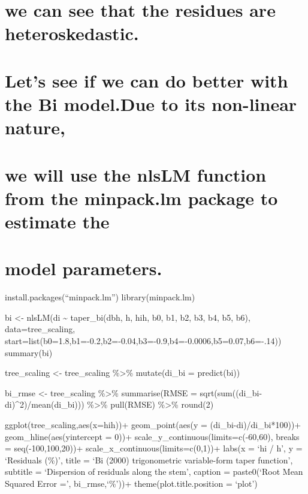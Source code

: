 \documentclass[
]{article}
\begin{document}
\hypertarget{we-can-see-that-the-residues-are-heteroskedastic.}{%
\section{we can see that the residues are
heteroskedastic.}\label{we-can-see-that-the-residues-are-heteroskedastic.}}

\hypertarget{lets-see-if-we-can-do-better-with-the-bi-model.due-to-its-non-linear-nature}{%
\section{Let's see if we can do better with the Bi model.Due to its
non-linear
nature,}\label{lets-see-if-we-can-do-better-with-the-bi-model.due-to-its-non-linear-nature}}

\hypertarget{we-will-use-the-nlslm-function-from-the-minpack.lm-package-to-estimate-the}{%
\section{we will use the nlsLM function from the minpack.lm package to
estimate
the}\label{we-will-use-the-nlslm-function-from-the-minpack.lm-package-to-estimate-the}}

\hypertarget{model-parameters.}{%
\section{model parameters.}\label{model-parameters.}}

install.packages(``minpack.lm'') library(minpack.lm)

bi \textless- nlsLM(di \textasciitilde{} taper\_bi(dbh, h, hih, b0, b1,
b2, b3, b4, b5, b6), data=tree\_scaling,
start=list(b0=1.8,b1=-0.2,b2=-0.04,b3=-0.9,b4=-0.0006,b5=0.07,b6=-.14))
summary(bi)

tree\_scaling \textless- tree\_scaling \%\textgreater\% mutate(di\_bi =
predict(bi))

bi\_rmse \textless- tree\_scaling \%\textgreater\% summarise(RMSE =
sqrt(sum((di\_bi-di)\^{}2)/mean(di\_bi))) \%\textgreater\% pull(RMSE)
\%\textgreater\% round(2)

ggplot(tree\_scaling,aes(x=hih))+ geom\_point(aes(y =
(di\_bi-di)/di\_bi*100))+ geom\_hline(aes(yintercept = 0))+
scale\_y\_continuous(limits=c(-60,60), breaks = seq(-100,100,20))+
scale\_x\_continuous(limits=c(0,1))+ labs(x = `hi / h', y = `Residuals
(\%)', title = `Bi (2000) trigonometric variable-form taper function',
subtitle = `Dispersion of residuals along the stem', caption =
paste0(`Root Mean Squared Error =', bi\_rmse,`\%'))+
theme(plot.title.position = `plot')
\end{document}
